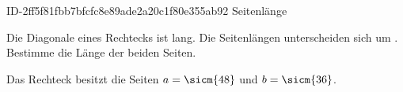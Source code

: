 \begin{exercise}
      {ID-2ff5f81fbb7bfcfc8e89ade2a20c1f80e355ab92}
      {Seitenlänge}
  \ifproblem\problem\par
    Die Diagonale eines Rechtecks ist  lang.
    Die Seitenlängen unterscheiden sich um .
    Bestimme die Länge der beiden Seiten.
  \fi
  \ifoutcome\outcome\par
    Das Rechteck besitzt die Seiten $a=\sicm{48}$ und $b=\sicm{36}$.
  \fi
\end{exercise}
